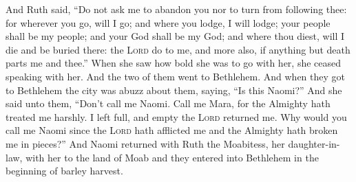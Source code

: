 \begin{inparaenum}
   And Ruth said, ``Do not ask me to abandon you nor to turn from following thee: for wherever you go, will I go; and where you lodge, I will lodge; your people shall be my people; and your God shall be my God;%
   and where thou diest, will I die and be buried there: the \textsc{Lord} do to me, and more also, if anything but death parts me and thee.''%
   When she saw how bold she was to go with her, she ceased speaking with her.%
   And the two of them went to Bethlehem. And when they got to Bethlehem the city was abuzz about them, saying, ``Is this Naomi?''%
   And she said unto them, ``Don't call me Naomi. Call me Mara, for the Almighty hath treated me harshly.%
   I left full, and empty the \textsc{Lord} returned me. Why would you call me Naomi since the \textsc{Lord} hath afflicted me and the Almighty hath broken me in pieces?''%
   And Naomi returned with Ruth the Moabitess, her daughter-in-law, with her to the land of Moab and they entered into Bethlehem in the beginning of barley harvest.%
\end{inparaenum}
